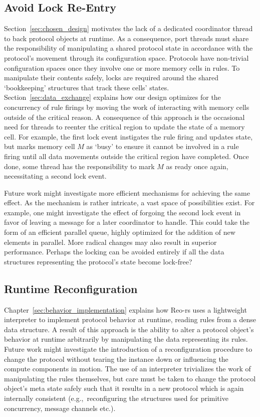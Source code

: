 \subsection{Avoid Lock Re-Entry}
Section~\ref{sec:chosen_design} motivates the lack of a dedicated coordinator thread to back protocol objects at runtime. As a consequence, port threads must share the responsibility of manipulating a shared protocol state in accordance with the protocol's movement through its configuration space. Protocols have non-trivial configuration spaces once they involve one or more memory cells in rules. To manipulate their contents safely, locks are required around the shared `bookkeeping' structures that track these cells' states. Section~\ref{sec:data_exchange} explains how our design optimizes for the concurrency of rule firings by moving the work of interacting with memory cells outside of the critical reason. A consequence of this approach is the occasional need for threads to reenter the critical region to update the state of a memory cell. For example, the first lock event instigates the rule firing and updates state, but marks memory cell $M$ as `busy' to ensure it cannot be involved in a rule firing until all data movements outside the critical region have completed. Once done, some thread has the responsibility to mark $M$ as ready once again, necessitating a second lock event.

Future work might investigate more efficient mechanisms for achieving the same effect. As the mechanism is rather intricate, a vast space of possibilities exist. For example, one might investigate the effect of forgoing the second lock event in favor of leaving a message for a later coordinator to handle. This could take the form of an efficient parallel queue, highly optimized for the addition of new elements in parallel. More radical changes may also result in superior performance. Perhaps the locking can be avoided entirely if all the data structures representing the protocol's state become lock-free?

\subsection{Runtime Reconfiguration}
Chapter~\ref{sec:behavior_implementation} explains how Reo-rs uses a lightweight interpreter to implement protocol behavior at runtime, reading rules from a dense data structure. A result of this approach is the ability to alter a protocol object's behavior at runtime arbitrarily by manipulating the data representing its rules. Future work might investigate the introduction of a reconfiguration procedure to change the protocol without tearing the instance down or influencing the compute components in motion. The use of an interpreter trivializes the work of manipulating the rules themselves, but care must be taken to change the protocol object's meta state safely such that it results in a new protocol which is again internally consistent (e.g.,\ reconfiguring the structures used for primitive concurrency, message channels etc.).

